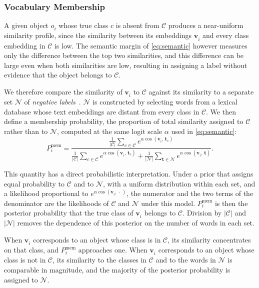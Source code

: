 \subsubsection{Vocabulary Membership}
A given object $o^{}_i$ whose true class $c$ is absent from $\mathcal{C}$ produces a near-uniform similarity profile, since the similarity between its embeddings $\mathbf{v}^{}_i$ and every class embedding in $\mathcal{C}$ is low. The semantic margin of \cref{eq:semantic} however measures only the difference between the top two similarities, and this difference can be large even when both similarities are low, resulting in assigning a label without evidence that the object belongs to $\mathcal{C}$.

We therefore compare the similarity of $\mathbf{v}^{}_i$ to $\mathcal{C}$ against its similarity to a separate set $\mathcal{N}$ of \emph{negative labels}~\cite{jiang2024negative}. $\mathcal{N}$ is constructed
by selecting words from a lexical database whose text embeddings are distant from every class in $\mathcal{C}$. We then define a membership probability, the proportion of total similarity assigned to $\mathcal{C}$ rather than to $\mathcal{N}$, computed at the same logit scale $\alpha$ used in \cref{eq:semantic}:
\begin{equation}
    P^{\mathrm{mem}}_i = \frac{\frac{1}{|\mathcal{C}|} \sum\limits_{c \in \mathcal{C}} e^{\alpha \cos(\mathbf{v}^{}_i,\, \mathbf{t}^{}_c)}}{\frac{1}{|\mathcal{C}|} \sum\limits_{c \in \mathcal{C}} e^{\alpha \cos(\mathbf{v}^{}_i,\, \mathbf{t}^{}_c)} + \frac{1}{|\mathcal{N}|} \sum\limits_{\mathbf{t} \in \mathcal{N}} e^{\alpha \cos(\mathbf{v}^{}_i,\, \mathbf{t})}}.
    \label{eq:membership}
\end{equation}

This quantity has a direct probabilistic interpretation. Under a prior that assigns equal probability to $\mathcal{C}$ and to $\mathcal{N}$, with a uniform distribution within each set, and a likelihood proportional to $e^{\alpha\cos(\mathbf{v}^{}_i,\, \cdot\,)}$, the numerator and the two terms of the denominator are the likelihoods of $\mathcal{C}$ and $\mathcal{N}$ under this model. $P^{\mathrm{mem}}_i$ is then the posterior probability that the true class of $\mathbf{v}^{}_i$ belongs to $\mathcal{C}$. Division by $|\mathcal{C}|$ and $|\mathcal{N}|$ removes the dependence of this posterior on the number of words in each set.

When $\mathbf{v}^{}_i$ corresponds to an object whose class is in $\mathcal{C}$, its similarity concentrates on that class, and $P^{\mathrm{mem}}_i$ approaches one. When $\mathbf{v}^{}_i$ corresponds to an object whose class is not in $\mathcal{C}$, its similarity to the classes in $\mathcal{C}$ and to the words in $\mathcal{N}$ is comparable in magnitude, and the majority of the posterior probability is assigned to $\mathcal{N}$.

